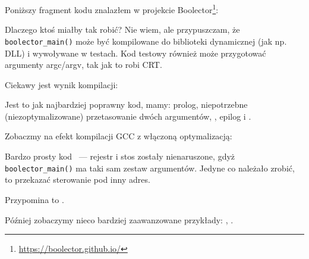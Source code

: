 \label{Boolector}

Poniższy fragment kodu znalazłem w projekcie Boolector\footnote{\url{https://boolector.github.io/}}:



Dlaczego ktoś miałby tak robić? Nie wiem, ale przypuszczam, że \verb|boolector_main()| może być kompilowane do biblioteki dynamicznej (jak np. DLL) i wywoływane w testach. Kod testowy również może przygotować argumenty argc/argv, tak jak to robi \ac{CRT}.

Ciekawy jest wynik kompilacji:



Jest to jak najbardziej poprawny kod, mamy: prolog, niepotrzebne (niezoptymalizowane) przetasowanie dwóch argumentów, , epilog i .

Zobaczmy na efekt kompilacji GCC z włączoną optymalizacją:



Bardzo prosty kod ~--- rejestr i stos zostały nienaruszone, gdyż \verb|boolector_main()| ma taki sam zestaw argumentów. Jedyne co należało zrobić, to przekazać sterowanie pod inny adres.

Przypomina to .

Później zobaczymy nieco bardziej zaawanzowane przykłady: , .

